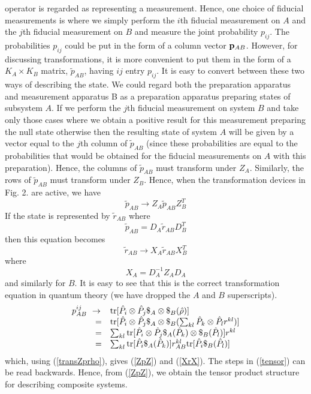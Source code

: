 \documentclass[10pt,twocolumn]{article}
\begin{document}
operator is regarded as representing a measurement.
Hence, one choice of fiducial measurements is where we simply
perform the $i$th fiducial measurement on $A$ and the $j$th fiducial
measurement on $B$ and measure the joint probability $p_{ij}$.
The probabilities $p_{ij}$ could be put in the form
of a column vector ${\bf p}_{AB}$.  However, for discussing transformations,
it is more convenient to put them in the form of a $K_A \times K_B$
matrix, $\tilde{p}_{AB}$, having $ij$ entry $p_{ij}$. It is easy to
convert between these two ways of describing the state.  We could
regard both the preparation apparatus and measurement apparatus B as a
preparation apparatus preparing states of subsystem $A$.  If we perform
the $j$th fiducial measurement on system $B$ and take only those cases
where we obtain a positive result for this measurement preparing the
null state otherwise then the
resulting state of system $A$ will be given by a vector equal to
the $j$th column of $\tilde{p}_{AB}$ (since these probabilities are
equal to the probabilities that would be obtained for the
fiducial measurements on $A$ with this preparation).  Hence, the columns
of $\tilde{p}_{AB}$ must transform under $Z_A$.
Similarly, the rows of $\tilde{p}_{AB}$ must
transform under $Z_B$.  Hence, when the transformation devices in Fig.
2. are active, we have
\begin{equation}\label{ZpZ}
\tilde{p}_{AB} \rightarrow Z_A \tilde{p}_{AB} Z_B^T
\end{equation}
If the state is represented by $\tilde{r}_{AB}$ where
\begin{equation}
\tilde{p}_{AB}=D_A\tilde{r}_{AB}D_B^T
\end{equation}
then this equation
becomes
\begin{equation}\label{XrX}
\tilde{r}_{AB} \rightarrow X_A \tilde{r}_{AB} X_B^T
\end{equation}
where
\begin{equation}
X_A=D^{-1}_AZ_AD_A
\end{equation}
and similarly for $B$.
It is easy to see that this is the correct transformation equation in
quantum theory (we have dropped the $A$ and $B$ superscripts).
\begin{equation}\label{tensor}
\begin{array}{rcl}
p^{ij}_{AB} &\!\!\! \rightarrow & {\rm tr}
[\hat{P}_i\otimes\hat{P}_j \$_A\otimes\$_B (\hat{\rho})  ] \\
 {} & = & {\rm tr}[\hat{P}_i\otimes\hat{P}_j\$_A\otimes\$_B
 (\sum_{kl}\hat{P}_k\otimes\hat{P}_l r^{kl} )] \\
 { } & = & \sum_{kl}{\rm tr}[\hat{P}_i\otimes\hat{P}_j
 \$_A(\hat{P}_k)\otimes\$_B(\hat{P}_l)] r^{kl} \\
 {} & = &  \sum_{kl} {\rm tr}[\hat{P}_i\$_A(\hat{P}_k)]
 r_{AB}^{kl} {\rm tr} [\hat{P}_i\$_B(\hat{P}_l)]
 \end{array}
\end{equation}
which, using (\ref{transZprho}), gives (\ref{ZpZ}) and (\ref{XrX}).  The steps
in (\ref{tensor}) can
be read backwards.  Hence, from (\ref{ZpZ}), we obtain the
tensor product structure for describing composite systems.
\end{document}
